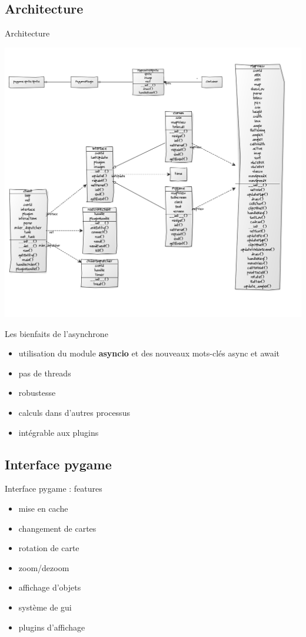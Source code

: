 \documentclass[11pt]{beamer}
\begin{document}
\subsection{Architecture}
\begin{frame}{Architecture}
	\begin{center}\includegraphics[scale=0.21]{uml_pygame.png}\end{center}
\end{frame}


\begin{frame}{Les bienfaits de l'asynchrone}
\begin{itemize}
\item utilisation du module \textbf{asyncio} et des nouveaux mots-clés async et await
\item pas de threads
\item robustesse
\item calculs dans d'autres processus
\item intégrable aux plugins
\end{itemize}
\end{frame}


\subsection{Interface pygame}
\begin{frame}{Interface pygame : features}
	\begin{itemize}
		\item mise en cache
    \item changement de cartes
    \item rotation de carte
    \item zoom/dezoom
    \item affichage d'objets
    \item système de gui
    \item plugins d'affichage
	\end{itemize}
\end{frame}
\end{document}
